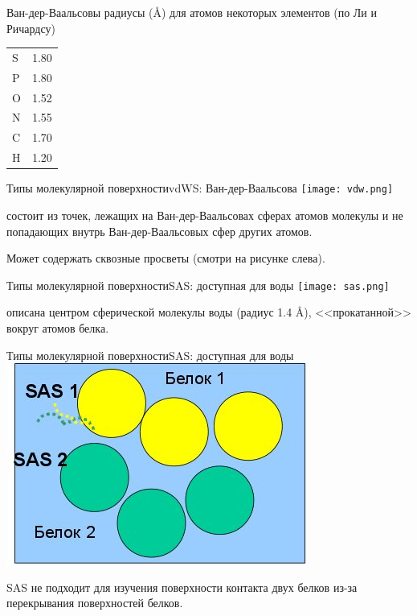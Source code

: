 \documentclass{beamer}
\begin{document}
    \begin{frame}{Ван-дер-Ваальсовы радиусы (\AA) для атомов
        некоторых элементов (по Ли и Ричардсу)}
        \begin{tabular}{ l l }
            S & 1.80 \\
            P & 1.80 \\
            O & 1.52 \\
            N & 1.55 \\
            C & 1.70 \\
            H & 1.20 \\
        \end{tabular}
    \end{frame}

    \begin{frame}{Типы молекулярной поверхности}{vdWS: Ван-дер-Ваальсова}
        \texttt{[image: vdw.png]}

        состоит из точек, лежащих на Ван-дер-Ваальсовах сферах атомов молекулы и
        не попадающих внутрь Ван-дер-Ваальсовых сфер других атомов.

        Может содержать сквозные просветы (смотри на рисунке слева).
    \end{frame}

    \begin{frame}{Типы молекулярной поверхности}{SAS: доступная для воды}
        \texttt{[image: sas.png]}

        описана центром сферической молекулы воды (радиус 1.4 \AA),
        <<прокатанной>> вокруг атомов белка.


    \end{frame}

    \begin{frame}{Типы молекулярной поверхности}{SAS: доступная для воды}
        \includegraphics[width=0.5\linewidth]{sas-contact.jpg}

        SAS не подходит для изучения поверхности контакта двух белков
        из-за перекрывания поверхностей белков.
    \end{frame}
\end{document}
